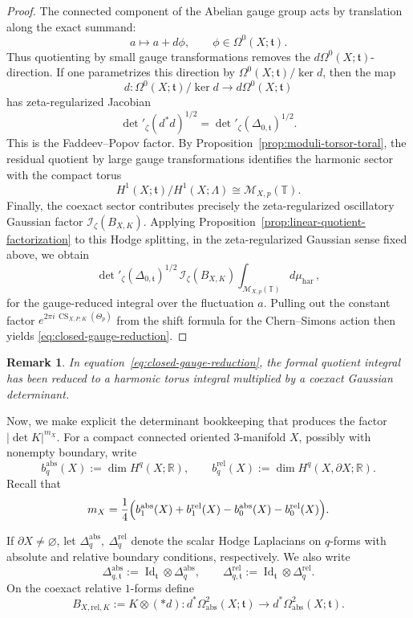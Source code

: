 \documentclass[12pt]{amsart}
\numberwithin{equation}{section}
\newtheorem*{remark}{Remark}
\begin{document}
\begin{proof}
The connected component of the Abelian gauge group acts by translation along the exact
summand:
\[
a\longmapsto a+d\phi,
\qquad
\phi\in \Omega^0(X;\mathfrak t).
\]
Thus quotienting by small gauge transformations removes the
\(d\Omega^0(X;\mathfrak t)\)-direction. If one parametrizes this direction by
\(\Omega^0(X;\mathfrak t)/\ker d\), then the map
\[
d:\Omega^0(X;\mathfrak t)/\ker d \longrightarrow d\Omega^0(X;\mathfrak t)
\]
has zeta-regularized Jacobian
\[
\det\nolimits'_{\zeta}(d^*d)^{1/2}
=
\det\nolimits'_{\zeta}(\Delta_{0,\mathfrak t})^{1/2}.
\]
This is the Faddeev--Popov factor. By Proposition~\ref{prop:moduli-torsor-toral},  the residual quotient by large gauge transformations identifies the harmonic
sector with the compact torus
\[
H^1(X;\mathfrak t)\big/ H^1(X;\Lambda)
\cong
\mathcal M_{X,p}(\mathbb T).
\]
Finally, the coexact sector contributes precisely the zeta-regularized oscillatory Gaussian
factor $\mathcal I_\zeta(B_{X,K}).$ Applying Proposition~\ref{prop:linear-quotient-factorization} to this Hodge splitting,
in the zeta-regularized Gaussian sense fixed above, we obtain
\[
\det\nolimits'_{\zeta}(\Delta_{0,\mathfrak t})^{1/2}\,
\mathcal I_\zeta(B_{X,K})\int_{\mathcal M_{X,p}(\mathbb T)} d\mu_{\mathrm{har}}\,,
\]
for the gauge-reduced integral over the fluctuation \(a\). Pulling out the constant factor $e^{2\pi i\,\operatorname{CS}_{X,P,K}(\Theta_p)}$
from the shift formula for the Chern--Simons action then yields
\eqref{eq:closed-gauge-reduction}.
\end{proof}

\begin{remark}
\label{rem:closed-gauge-reduction}
In equation~\eqref{eq:closed-gauge-reduction}, the formal quotient integral has been reduced
to a harmonic torus integral multiplied by a coexact Gaussian determinant.
\end{remark}

Now, we make explicit the determinant bookkeeping that produces the factor
\(|\det K|^{m_X}\). For a compact connected oriented \(3\)-manifold \(X\), possibly with nonempty boundary,
write
\[
b_q^{\mathrm{abs}}(X):=\dim H^q(X;\mathbb R),
\qquad
b_q^{\mathrm{rel}}(X):=\dim H^q(X,\partial X;\mathbb R).
\]
Recall that
\[
m_X
=
\frac14\Bigl(
b_1^{\mathrm{abs}}(X)+b_1^{\mathrm{rel}}(X)
-b_0^{\mathrm{abs}}(X)-b_0^{\mathrm{rel}}(X)
\Bigr).
\]

If \(\partial X\neq\varnothing\), let $\Delta_q^{\mathrm{abs}},\ \Delta_q^{\mathrm{rel}}$ denote the scalar Hodge Laplacians on \(q\)-forms with absolute and relative boundary
conditions, respectively. We also write
\[
\Delta^{\mathrm{abs}}_{q,\mathfrak t}:=
\operatorname{Id}_{\mathfrak t}\otimes \Delta_q^{\mathrm{abs}},
\qquad
\Delta^{\mathrm{rel}}_{q,\mathfrak t}:=
\operatorname{Id}_{\mathfrak t}\otimes \Delta_q^{\mathrm{rel}}.
\]
On the coexact relative \(1\)-forms define
\[
B_{X,\mathrm{rel},K}:=
K\otimes (*d)
:
d^*\Omega^2_{\mathrm{abs}}(X;\mathfrak t)
\longrightarrow
d^*\Omega^2_{\mathrm{abs}}(X;\mathfrak t).
\]
\end{document}
